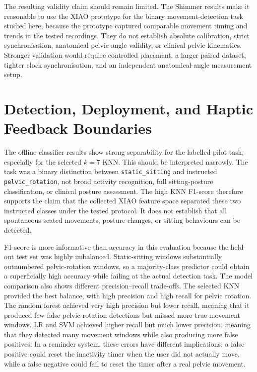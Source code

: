 The resulting validity claim should remain limited. The Shimmer results make it reasonable to use the XIAO prototype for the binary movement-detection task studied here, because the prototype captured comparable movement timing and trends in the tested recordings. They do not establish absolute calibration, strict synchronisation, anatomical pelvic-angle validity, or clinical pelvic kinematics. Stronger validation would require controlled placement, a larger paired dataset, tighter clock synchronisation, and an independent anatomical-angle measurement setup.

\section{Detection, Deployment, and Haptic Feedback Boundaries}

The offline classifier results show strong separability for the labelled pilot task, especially for the selected \(k=7\) KNN. This should be interpreted narrowly. The task was a binary distinction between \texttt{static\_sitting} and instructed \texttt{pelvic\_rotation}, not broad activity recognition, full sitting-posture classification, or clinical posture assessment. The high KNN F1-score therefore supports the claim that the collected XIAO feature space separated these two instructed classes under the tested protocol. It does not establish that all spontaneous seated movements, posture changes, or sitting behaviours can be detected.

F1-score is more informative than accuracy in this evaluation because the held-out test set was highly imbalanced. Static-sitting windows substantially outnumbered pelvic-rotation windows, so a majority-class predictor could obtain a superficially high accuracy while failing at the actual detection task. The model comparison also shows different precision--recall trade-offs. The selected KNN provided the best balance, with high precision and high recall for pelvic rotation. The random forest achieved very high precision but lower recall, meaning that it produced few false pelvic-rotation detections but missed more true movement windows. LR and SVM achieved higher recall but much lower precision, meaning that they detected many movement windows while also producing more false positives. In a reminder system, these errors have different implications: a false positive could reset the inactivity timer when the user did not actually move, while a false negative could fail to reset the timer after a real pelvic movement.

